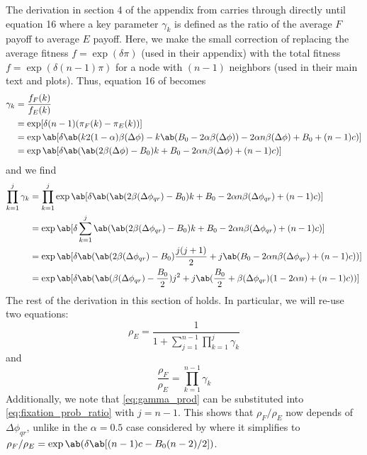 The derivation in section 4 of the appendix
from \tripp{}
carries through directly until equation 16
where a key parameter $\gamma_k$ is defined
as the ratio of the average $F$ payoff to average $E$ payoff.
Here, we make the small correction of replacing
the average fitness $f = \exp(\delta \pi)$ (used in their appendix)
with the total fitness $f = \exp(\delta (n-1) \pi)$
for a node with $(n-1)$ neighbors
(used in their main text and plots).
Thus, equation 16 of \tripp{} becomes
\begin{align*}
  \gamma_k &= \frac{f_F(k)}{f_E(k)} \\
           &= \exp[\delta (n-1) (\pi_F(k) - \pi_E(k))]
           \\
           &= \exp\ab[\delta \ab(
    k 2 (1-\alpha) \beta(\Delta\phi)
    - k \ab(B_0 - 2 \alpha \beta(\Delta\phi))
                 - 2 \alpha n \beta(\Delta\phi) + B_0 + (n-1) c)] \\
      &= \exp\ab[\delta \ab(
    \ab(2 \beta(\Delta\phi) - B_0) k
                 + B_0 - 2 \alpha n \beta(\Delta\phi) + (n-1) c)]
\end{align*}
and we find
\begin{equation}
  \begin{aligned}
    \prod_{k=1}^j  \gamma_k
      &= \prod_{k=1}^j \exp\ab[\delta \ab(
      \ab(2 \beta(\Delta\phi_{qr}) - B_0) k
      + B_0 - 2 \alpha n \beta(\Delta\phi_{qr}) + (n-1) c)]
      \\
      &= \exp\ab[\delta \sum_{k=1}^j \ab(
      \ab(2 \beta(\Delta\phi_{qr}) - B_0) k
      + B_0 - 2 \alpha n \beta(\Delta\phi_{qr}) + (n-1) c)]
      \\
      &= \exp\ab[\delta \ab(
      \ab(2 \beta(\Delta\phi_{qr}) - B_0) \frac{j(j+1)}{2}
      + j \ab(B_0 - 2 \alpha n \beta(\Delta\phi_{qr}) + (n-1) c))]
      \\
      &= \exp\ab[\delta \ab(
      \ab(\beta(\Delta\phi_{qr}) - \frac{B_0}{2}) j^2
      + j \ab(\frac{B_0}{2} + \beta(\Delta\phi_{qr}) (1 - 2 \alpha n)  + (n-1) c))]
  \end{aligned}
  \label{eq:gamma_prod}
\end{equation}
The rest of the derivation in this section of \tripp{} holds.
In particular, we will re-use two equations:
\begin{equation}
    \rho_E = \frac{1}{1+\sum_{j=1}^{n-1} \prod_{k=1}^j \gamma_k}
  \label{eq:comm_fixation_prob}
\end{equation}
and
\begin{equation}
  \frac{\rho_F}{\rho_E} = \prod_{k=1}^{n-1} \gamma_k
  \label{eq:fixation_prob_ratio}
\end{equation}
Additionally, we note that
\cref{eq:gamma_prod} can be substituted into \cref{eq:fixation_prob_ratio}
with $j=n-1$.
This shows that $\rho_F/\rho_E$
now depends of $\Delta \phi_{qr}$,
unlike in the $\alpha=0.5$ case considered by \tripp{}
where it simplifies to
$\rho_F/\rho_E = \exp \ab(\delta \ab[(n-1)c - B_0 (n-2)/2])$.

